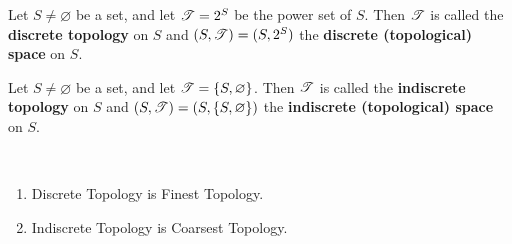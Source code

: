 \documentclass[11pt,openany]{article}
\begin{document}
\newpage
\begin{example}
	Let $S\neq\varnothing$ be a set, and let $\mathscr{T}=2^S$ be the power set of $S$. Then $\mathscr{T}$ is called the \textbf{discrete topology} on $S$ and $(S,\mathscr{T})=(S,2^S)$ the \textbf{discrete (topological) space} on $S$.
\end{example}
\vfill
\begin{example}
	Let $S\neq\varnothing$ be a set, and let $\mathscr{T}=\set{S,\varnothing}$. Then $\mathscr{T}$ is called the \textbf{indiscrete topology} on $S$ and $(S,\mathscr{T})=(S,\set{S,\varnothing})$ the \textbf{indiscrete (topological) space} on $S$.
\end{example}
\vfill
\begin{note}
\ \begin{enumerate}[(1)]
	\item Discrete Topology is Finest Topology.
	\item Indiscrete Topology is Coarsest Topology.
\end{enumerate}
\end{note}
\vfill
{}
\end{document}
